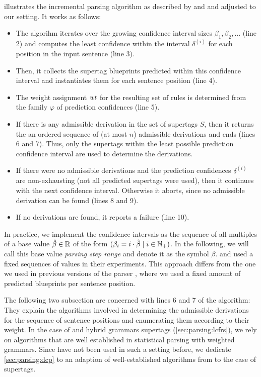 \documentclass[../../document.tex]{subfiles}
\begin{document}
     illustrates the incremental parsing algorithm as described by \citet[Section~5.1]{Clark04} and \citet[Section~2.2.2]{Auli12} and adjusted to our setting.
    It works as follows:
    \begin{itemize}
        \item The algorihm iterates over the growing confidence interval sizes \(\beta_1, \beta_2, \ldots\) (line 2) and computes the least confidence within the interval \(\delta^{(i)}\) for each position in the input sentence (line 3).
        \item Then, it collects the supertag blueprints predicted within this confidence interval and instantiates them for each sentence position (line 4).
        \item The weight assignment \(\mathit{wt}\) for the resulting set of rules is determined from the family \(\varphi\) of prediction confidences (line 5).
        \item If there is any admissible derivation in the set of supertags \(S\), then it returns the an ordered sequence of (at most \(n\)) admissible derivations and ends (lines 6 and 7). Thus, only the supertags within the least possible prediction confidence interval are used to determine the derivations.
        \item If there were no admissible derivations and the prediction confidences \(\delta^{(i)}\) are non-exhausting (not all predicted supertags were used), then it continues with the next confidence interval. Otherwise it aborts, since no admissible derivation can be found (lines 8 and 9).
        \item If no derivations are found, it reports a failure (line 10).
    \end{itemize}
    In practice, we implement the confidence intervals as the sequence of all multiples of a base value \(\hat{\beta}\in \mathbb{R}\) of the form \((\beta_i = i \cdot \hat{\beta} \mid i \in \mathbb{N}_+)\).
    In the following, we will call this base value \emph{parsing step range} and denote it as the symbol \(\beta\).
     and \citet{Auli12} used a fixed sequences of values in their experiments.
    This approach differs from the one we used in previous versions of the parser \citep{RupMoe21, Rup22}, where we used a fixed amount of predicted blueprints per sentence position.
    
    The following two subsection are concerned with lines 6 and 7 of the algorithm:
        They explain the algorithms involved in determining the admissible derivations for the sequence of sentence positions and enumerating them according to their weight.
    In the case of  and hybrid grammars supertags (\cref{sec:parsing:lcfrs}), we rely on algorithms that are well established in statistical parsing with weighted grammars.
    Since  have not been used in such a setting before, we dedicate \cref{sec:parsing:dcp} to an adaption of well-established algorithms from  to the case of  supertags.
\end{document}
